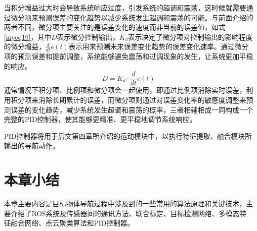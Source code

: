 当积分增益过大时会导致系统响应过度，引发系统的超调和震荡，这时候就需要通过微分项来预测误差的变化趋势以减少系统发生超调和震荡的可能。与前面介绍的两者不同，微分项主要关注的是误差变化的速度而非当前的误差值，如式\ref{myeq19}，其中$D$表示微分控制输出，${K_d}$表示决定了微分项对控制输出的影响程度的微分增益，$\frac{d}{{dt}}e\left( t \right)$表示用来预测未来误差变化趋势的误差变化速率。通过微分项的预测误差和提前调整，系统能够避免震荡和过调现象的发生，让系统更加平稳的响应。
\begin{equation}
    D = {K_d} \cdot \frac{d}{{dt}}e\left( t \right)
    \label{myeq19}
\end{equation}
通常情况下积分项、比例项和微分项会一起使用，即通过比例项消除实时误差，利用积分项来消除长期累计的误差，而微分项则通过对误差变化率的敏感度调整来预测误差的变化趋势，减少系统发生超调和震荡的概率，三者相辅相成一同构成一个完整的PID控制器，使其能够更精准、更平稳地调节系统响应。

PID控制器将用于后文第四章所介绍的运动模块中，以执行特征提取、融合模块所输出的导航动作。

\section{本章小结}
本章主要内容是目标物体导航过程中涉及到的一些常用的算法原理和关键技术，主要介绍了ROS系统及传感器间的通讯方法、联合标定、目标检测网络、多模态特征融合网络、点云聚类算法和PID控制器。

